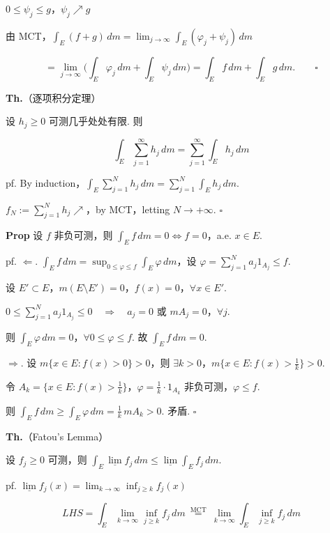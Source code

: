 \documentclass[11pt]{ctexart}
\theoremstyle{definition}
\begin{document}
$0 \leq \psi_j \leq g$，$\psi_j \nearrow g$

由 MCT，$\displaystyle\int_E (f+g)\, dm = \lim_{j \to \infty} \int_E (\varphi_j + \psi_j)\, dm$

\[
= \lim_{j \to \infty} \Big( \int_E \varphi_j \, dm + \int_E \psi_j \, dm \Big) = \int_E f\, dm + \int_E g\, dm. \qquad \square
\]

\textbf{Th.}（逐项积分定理）

设 $h_j \geq 0$ 可测几乎处处有限. 则

\[
\int_E \sum_{j=1}^{\infty} h_j \, dm = \sum_{j=1}^{\infty} \int_E h_j \, dm
\]

pf. By induction，$\displaystyle\int_E \sum_{j=1}^{N} h_j \, dm = \sum_{j=1}^{N} \int_E h_j \, dm$.

$f_N := \sum\limits_{j=1}^{N} h_j \nearrow$，by MCT，letting $N \to +\infty$. $\square$

\textbf{Prop} 设 $f$ 非负可测，则 $\displaystyle\int_E f \, dm = 0 \iff f = 0$，a.e. $x \in E$.

pf. $\Leftarrow$. $\displaystyle\int_E f \, dm = \sup_{0 \leq \varphi \leq f} \int_E \varphi \, dm$，设 $\varphi = \sum\limits_{j=1}^{N} a_j 1_{A_j} \leq f$.

设 $E' \subset E$，$m(E \setminus E') = 0$，$f(x) = 0$，$\forall x \in E'$.

$0 \leq \sum\limits_{j=1}^{N} a_j 1_{A_j} \leq 0 \quad \Rightarrow \quad a_j = 0$ 或 $mA_j = 0$，$\forall j$.

则 $\displaystyle\int_E \varphi \, dm = 0$，$\forall 0 \leq \varphi \leq f$. 故 $\displaystyle\int_E f \, dm = 0$.

$\Rightarrow$. 设 $m\{x \in E : f(x) > 0\} > 0$，则 $\exists k > 0$，$m\{x \in E : f(x) > \tfrac{1}{k}\} > 0$.

令 $A_k = \{x \in E : f(x) > \tfrac{1}{k}\}$，$\varphi = \tfrac{1}{k} \cdot 1_{A_k}$ 非负可测，$\varphi \leq f$.

则 $\displaystyle\int_E f \, dm \geq \int_E \varphi \, dm = \tfrac{1}{k}\, mA_k > 0$. 矛盾. $\square$

\textbf{Th.}（Fatou's Lemma）

设 $f_j \geq 0$ 可测，则 $\displaystyle\int_E \underline{\lim} f_j \, dm \leq \underline{\lim} \int_E f_j \, dm$.

pf. $\displaystyle\underline{\lim} f_j(x) = \lim_{k \to \infty} \inf_{j \geq k} f_j(x)$

\[
LHS = \int_E \lim_{k \to \infty} \inf_{j \geq k} f_j \, dm \ \overset{\text{MCT}}{=}\ \lim_{k \to \infty} \int_E \inf_{j \geq k} f_j \, dm
\]
\end{document}
